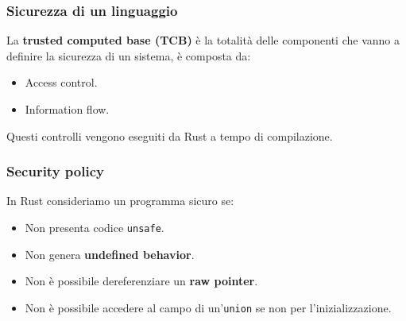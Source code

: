 \documentclass{beamer}
\newcommand{\textcode}[1]{\colorbox{backcolour}{\texttt{#1}}}
\begin{document}
\begin{frame}
    \frametitle{Sicurezza di un linguaggio}
    La \textbf{trusted computed base (TCB)} è la totalità delle componenti che vanno a definire la sicurezza di un sistema, è composta da: 
    \begin{itemize}
        \item Access control.
        \item Information flow.
    \end{itemize}
    Questi controlli vengono eseguiti da Rust a tempo di compilazione.
\end{frame}

\begin{frame}
    \frametitle{Security policy}
    In Rust consideriamo un programma sicuro se:
    \begin{itemize}
        \item Non presenta codice \textcode{unsafe}.
        \item Non genera \textbf{undefined behavior}.
        \item Non è possibile dereferenziare un \textbf{raw pointer}.
        \item Non è possibile accedere al campo di un'\textcode{union} se non per l'inizializzazione.
    \end{itemize}
\end{frame}

\end{document}
